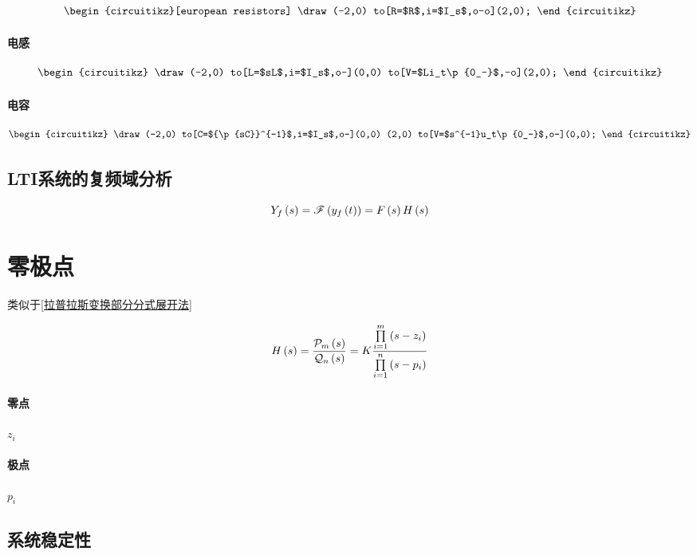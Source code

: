 \documentclass{article}
\begin{document}
\[\begin{circuitikz}[european resistors]
        \draw(-2,0)
        to[R=$R$,i=$I_s$,o-o](2,0);
    \end{circuitikz}\]

\paragraph{电感}

\[\begin{circuitikz}
        \draw(-2,0)
        to[L=$sL$,i=$I_s$,o-](0,0)
        to[V=$Li_t\p{0_-}$,-o](2,0);
    \end{circuitikz}\]

\paragraph{电容}

\[\begin{circuitikz}
        \draw(-2,0)
        to[C=${\p{sC}}^{-1}$,i=$I_s$,o-](0,0)
        (2,0)
        to[V=$s^{-1}u_t\p{0_-}$,o-](0,0);
    \end{circuitikz}\]

\subsection{LTI系统的复频域分析}

\[Y_f\left(s\right)=\mathscr F\left(y_f\left(t\right)\right)=F\left(s\right) H\left(s\right)\]

\section{零极点}

类似于\ref{拉普拉斯变换部分分式展开法}

\[H\left(s\right)=\frac{\mathcal P_m\left(s\right)}{\mathcal Q_n\left(s\right)}
    =K\frac{\prod\limits_{i=1}^m\left(s-z_i\right)}
    {\prod\limits_{i=1}^n\left(s-p_i\right)}\]

\paragraph{零点}$z_i$

\paragraph{极点}$p_i$

\subsection{系统稳定性}
\end{document}
